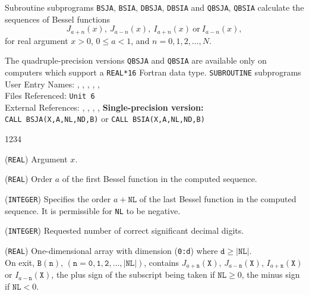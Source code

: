                              
                     
\Submitter{}                                
                         
Subroutine subprograms {\tt BSJA}, {\tt BSIA},
{\tt DBSJA}, {\tt DBSIA} and {\tt QBSJA}, {\tt QBSIA}
calculate the sequences of Bessel functions
$$ J_{a+n}(x), \ J_{a-n}(x), \ I_{a+n}(x) \
\mathrm{or} \ I_{a-n}(x),$$
for real argument $x>0$, $0\leq a<1$, and $n=0,1,2,\ldots,N$.
\par
The quadruple-precision versions {\tt QBSJA} and {\tt QBSIA}
are available only on computers which support a {\tt REAL*16}
Fortran data type.
\Structure
{\tt SUBROUTINE} subprograms\\
User Entry Names: , , , ,
\Rdef{QBSJA}, \Rdef{QBSIA} \\
Files Referenced: {\tt Unit 6} \\
External References:
, , ,
, 
\Usage
{\bf Single-precision version:} \\[2mm]
\hspace*{8mm} {\tt CALL BSJA(X,A,NL,ND,B)} \qquad or \qquad
              {\tt CALL BSIA(X,A,NL,ND,B)}
\begin{DLtt}{1234}
\item[X] ({\tt REAL}) Argument $x$.
\item[A] ({\tt REAL}) Order $a$ of the first Bessel function in the
computed sequence.
\item[NL] ({\tt INTEGER}) Specifies the order $a+\mathtt{NL}$ of the last
Bessel function in the computed sequence.
It is permissible for {\tt NL} to be negative.
\item[ND] ({\tt INTEGER}) Requested number of correct significant
decimal digits.
\item[B] ({\tt REAL}) One-dimensional array with dimension
({\tt 0:d}) where $\mathtt{d} \geq \mathtt{|NL|}$. \\
On exit, $\mathtt{B(n)}$, $\mathtt{(n = 0,1,2,\ldots,|NL|)}$,
contains $J_{a+\mathtt{n}}(\mathtt{X})$, $J_{a-\mathtt{n}}(\mathtt{X})$,
$I_{a+\mathtt{n}}(\mathtt{X})$ or $I_{a-\mathtt{n}}(\mathtt{X})$,
the plus sign of the subscript being taken if $\mathtt{NL} \geq 0 $,
the minus sign if $\mathtt{NL} < 0$.
\end{DLtt}
